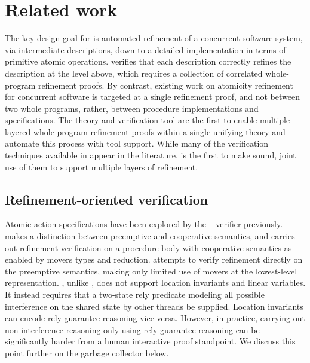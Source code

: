
\section{Related work}
\label{sec:related}

The key design goal for \civl is automated refinement of a concurrent software system,
via intermediate descriptions, down to a detailed implementation in terms of primitive atomic operations.
\civl verifies that each description correctly refines the description
at the level above, which requires a collection of correlated
whole-program refinement proofs. 
By contrast, existing work on atomicity refinement for concurrent software is
targeted at a single refinement proof, and not between two whole
programs, rather, between procedure implementations and
specifications. 
The \civl theory and verification tool are the first to
enable multiple layered whole-program refinement proofs
within a single unifying theory and automate this process with tool support.
While many of the verification techniques available in \civl appear in
the literature, \civl is the first to make sound, joint use of them to
support multiple layers of refinement. 

\subsection{Refinement-oriented verification}
Atomic action specifications have been explored by the
\calvin~\cite{FlanaganFQS05,FreundQ04} verifier previously. 
\civl makes a distinction between preemptive and cooperative
semantics, and carries out refinement verification on a procedure body
with cooperative semantics as enabled by movers types and reduction.
\calvin attempts to verify refinement directly on the preemptive
semantics, making only limited use of movers at the lowest-level
representation. 
\calvin, unlike \civl, does not support location invariants and linear
variables. 
It instead requires that a two-state rely predicate modeling all possible
interference on the shared state by other threads be supplied. 
Location invariants can encode rely-guarantee reasoning vice versa. 
However, in practice, carrying out non-interference reasoning only
using rely-guarantee reasoning can be significantly harder from a
human interactive proof standpoint. We discuss this point further on
the garbage collector below. 

